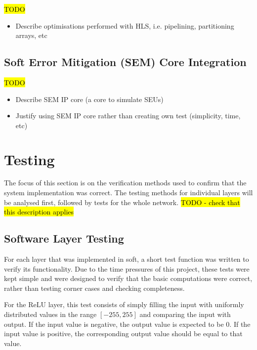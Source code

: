 \documentclass[12pt]{article}
\begin{document}
\hl{TODO}

\begin{itemize}
\item Describe optimisations performed with HLS, i.e. pipelining, partitioning arrays, etc

\end{itemize}

\subsection{Soft Error Mitigation (SEM) Core Integration}
\label{sec:Imp-SEM}

\hl{TODO}

\begin{itemize}
\item Describe SEM IP core (a core to simulate SEUs)
\item Justify using SEM IP core rather than creating own test (simplicity, time, etc)
\end{itemize}

\newpage

\section{Testing}
\label{sec:Test}


The focus of this section is on the verification methods used to confirm that the system implementation was correct. The testing methods for individual layers will be analysed first, followed by tests for the whole network. \hl{TODO - check that this description applies}

\subsection{Software Layer Testing}
\label{sec:Test-Layers}

For each layer that was implemented in soft, a short test function was written to verify its functionality. Due to the time pressures of this project, these tests were kept simple and were designed to verify that the basic computations were correct, rather than testing corner cases and checking completeness.

For the ReLU layer, this test consists of simply filling the input with uniformly distributed values in the range $[-255, 255]$ and comparing the input with output. If the input value is negative, the output value is expected to be $0$. If the input value is positive, the corresponding output value should be equal to that value.
\end{document}
